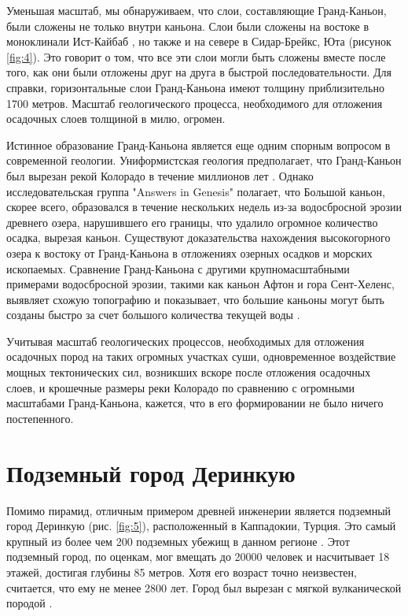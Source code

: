 \documentclass[10pt,twocolumn,letterpaper]{article}
\begin{document}
Уменьшая масштаб, мы обнаруживаем, что слои, составляющие Гранд-Каньон, были сложены не только внутри каньона. Слои были сложены на востоке в моноклинали Ист-Кайбаб \cite{46}, но также и на севере в Сидар-Брейкс, Юта (рисунок \ref{fig:4}). Это говорит о том, что все эти слои могли быть сложены вместе после того, как они были отложены друг на друга в быстрой последовательности. Для справки, горизонтальные слои Гранд-Каньона имеют толщину приблизительно 1700 метров. Масштаб геологического процесса, необходимого для отложения осадочных слоев толщиной в милю, огромен.

Истинное образование Гранд-Каньона является еще одним спорным вопросом в современной геологии. Униформистская геология предполагает, что Гранд-Каньон был вырезан рекой Колорадо в течение миллионов лет \cite{47}. Однако исследовательская группа "Answers in Genesis" полагает, что Большой каньон, скорее всего, образовался в течение нескольких недель из-за водосбросной эрозии древнего озера, нарушившего его границы, что удалило огромное количество осадка, вырезая каньон. Существуют доказательства нахождения высокогорного озера к востоку от Гранд-Каньона в отложениях озерных осадков и морских ископаемых. Сравнение Гранд-Каньона с другими крупномасштабными примерами водосбросной эрозии, такими как каньон Афтон и гора Сент-Хеленс, выявляет схожую топографию и показывает, что большие каньоны могут быть созданы быстро за счет большого количества текущей воды \cite{48}.

Учитывая масштаб геологических процессов, необходимых для отложения осадочных пород на таких огромных участках суши, одновременное воздействие мощных тектонических сил, возникших вскоре после отложения осадочных слоев, и крошечные размеры реки Колорадо по сравнению с огромными масштабами Гранд-Каньона, кажется, что в его формировании не было ничего постепенного.

\section{Подземный город Деринкую}

Помимо пирамид, отличным примером древней инженерии является подземный город Деринкую (рис. \ref{fig:5}), расположенный в Каппадокии, Турция. Это самый крупный из более чем 200 подземных убежищ в данном регионе \cite{54}. Этот подземный город, по оценкам, мог вмещать до 20000 человек и насчитывает 18 этажей, достигая глубины 85 метров. Хотя его возраст точно неизвестен, считается, что ему не менее 2800 лет. Город был вырезан с мягкой вулканической породой \cite{52, 53}.
\end{document}

